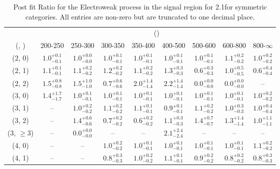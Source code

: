 \begin{table}[h!]
\tiny
\centering
\caption{Post fit Ratio for the Electroweak process in the signal region for 2.1\ifb for symmetric categories. All entries are non-zero but are truncated to one decimal place.\label{tab:ratioseppost_sig_ewk_sym}}
\begin{tabular}
{ccccccccc}
	\hline\hline
	& \multicolumn{8}{c}{\scalht (\gev)} \\ 
	 (\njet,  \nb) & 200-250 & 250-300 & 300-350 & 350-400 & 400-500 & 500-600 & 600-800 & 800-$\infty$ \\ [0.8ex] 
\hline
	(2, 0) & $1.0^{+ 0.1 }_{- 0.1 }$ & $1.0^{+ 0.0 }_{- 0.0 }$ & $1.0^{+ 0.1 }_{- 0.1 }$ & $1.0^{+ 0.1 }_{- 0.1 }$ & $1.0^{+ 0.1 }_{- 0.1 }$ & $1.0^{+ 0.1 }_{- 0.1 }$ & $1.1^{+ 0.2 }_{- 0.2 }$ & $1.0^{+ 0.2 }_{- 0.2 }$ \\[0.5ex] 
	(2, 1) & $1.1^{+ 0.1 }_{- 0.1 }$ & $1.1^{+ 0.2 }_{- 0.2 }$ & $1.2^{+ 0.2 }_{- 0.2 }$ & $1.1^{+ 0.2 }_{- 0.2 }$ & $1.3^{+ 0.3 }_{- 0.3 }$ & $0.6^{+ 0.3 }_{- 0.3 }$ & $1.0^{+ 0.5 }_{- 0.5 }$ & $0.6^{+ 0.4 }_{- 0.4 }$ \\[0.5ex] 
	(2, 2) & $1.5^{+ 0.8 }_{- 0.8 }$ & $1.5^{+ 1.0 }_{- 1.0 }$ & $0.7^{+ 0.6 }_{- 0.6 }$ & $2.0^{+ 1.4 }_{- 1.4 }$ & $2.2^{+ 1.4 }_{- 1.4 }$ & $0.0^{+ 0.0 }_{- 0.0 }$ & $0.0^{+ 0.0 }_{- 0.0 }$ & -- \\[0.5ex] 
	(3, 0) & $1.4^{+ 1.7 }_{- 1.7 }$ & $1.0^{+ 0.1 }_{- 0.1 }$ & $1.0^{+ 0.1 }_{- 0.1 }$ & $1.0^{+ 0.1 }_{- 0.1 }$ & $1.0^{+ 0.1 }_{- 0.1 }$ & $1.0^{+ 0.1 }_{- 0.1 }$ & $1.0^{+ 0.1 }_{- 0.1 }$ & $1.0^{+ 0.2 }_{- 0.2 }$ \\[0.5ex] 
	(3, 1) & -- & $1.0^{+ 0.2 }_{- 0.2 }$ & $1.1^{+ 0.2 }_{- 0.2 }$ & $1.1^{+ 0.1 }_{- 0.1 }$ & $0.9^{+ 0.1 }_{- 0.1 }$ & $1.1^{+ 0.2 }_{- 0.2 }$ & $1.0^{+ 0.3 }_{- 0.3 }$ & $1.0^{+ 0.4 }_{- 0.4 }$ \\[0.5ex] 
	(3, 2) & -- & $1.4^{+ 0.6 }_{- 0.6 }$ & $0.7^{+ 0.2 }_{- 0.2 }$ & $0.6^{+ 0.2 }_{- 0.2 }$ & $1.1^{+ 0.3 }_{- 0.3 }$ & $1.4^{+ 0.7 }_{- 0.7 }$ & $1.3^{+ 1.4 }_{- 1.4 }$ & $1.0^{+ 1.1 }_{- 1.1 }$ \\[0.5ex] 
	(3, $\ge3$) & -- & $0.0^{+ 0.0 }_{- 0.0 }$ & -- & -- & $2.1^{+ 2.4 }_{- 2.4 }$ & -- & -- & -- \\[0.5ex] 
	(4, 0) & -- & -- & $1.0^{+ 0.2 }_{- 0.2 }$ & $1.0^{+ 0.1 }_{- 0.1 }$ & $1.0^{+ 0.1 }_{- 0.1 }$ & $1.0^{+ 0.1 }_{- 0.1 }$ & $1.0^{+ 0.1 }_{- 0.1 }$ & $1.1^{+ 0.2 }_{- 0.2 }$ \\[0.5ex] 
	(4, 1) & -- & -- & $0.8^{+ 0.3 }_{- 0.3 }$ & $1.0^{+ 0.2 }_{- 0.2 }$ & $1.1^{+ 0.1 }_{- 0.1 }$ & $0.9^{+ 0.2 }_{- 0.2 }$ & $0.8^{+ 0.2 }_{- 0.2 }$ & $0.8^{+ 0.3 }_{- 0.3 }$ \\[0.5ex] 

\end{tabular}
\end{table}
